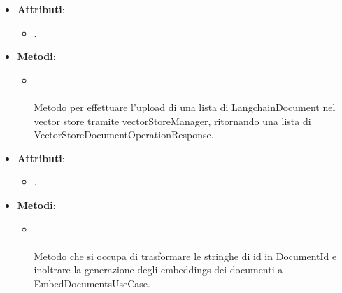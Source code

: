 \documentclass[10pt, a4paper]{article}
\begin{document}
\label{EmbeddingsUploaderVectorStoreDettaglio}
\begin{itemize}
    \item \textbf{Attributi}:
    \begin{itemize}
        \item {}.
    \end{itemize}
    \item \textbf{Metodi}:
    \begin{itemize}
        \item {}\\\\
        Metodo per effettuare l'upload di una lista di LangchainDocument nel vector store tramite vectorStoreManager, ritornando una lista di VectorStoreDocumentOperationResponse.
    \end{itemize}
\end{itemize}


\label{EmbedDocumentsControllerDettaglio}
\begin{itemize}
    \item \textbf{Attributi}:
    \begin{itemize}
        \item {}.
    \end{itemize}
    \item \textbf{Metodi}:
    \begin{itemize}
        \item {}\\ \\
        Metodo che si occupa di trasformare le stringhe di id in DocumentId e inoltrare la generazione degli embeddings dei documenti a EmbedDocumentsUseCase.
    \end{itemize}
\end{itemize}
\end{document}
